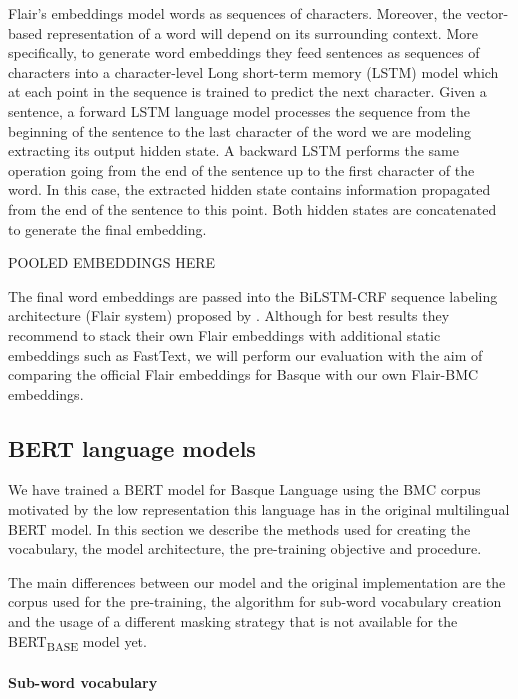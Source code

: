 \documentclass[10pt, a4paper]{article}
\begin{document}
Flair's embeddings model words as sequences of characters. Moreover, the vector-based representation of a word will depend on its surrounding context. More specifically, to generate word embeddings they feed sentences as sequences of characters into a character-level Long short-term memory (LSTM) model which at each point in the sequence is trained to predict the next character. Given a sentence, a forward LSTM language model processes the sequence from the beginning of the sentence to the last character of the word we are modeling extracting its output hidden state. A backward LSTM performs the same operation going from the end of the sentence up to the first character of the word. In this case, the extracted hidden state contains information propagated from the end of the sentence to this point. Both hidden states are concatenated to generate the final embedding.

POOLED EMBEDDINGS HERE

The final word embeddings are passed into the BiLSTM-CRF sequence labeling architecture (Flair system) proposed by \cite{huang2015bidirectional}. Although for best results they recommend to stack their own Flair embeddings with additional static embeddings such as FastText, we will perform our evaluation with the aim of comparing the official Flair embeddings for Basque with our own Flair-BMC embeddings.

\subsection{BERT language models}\label{sec:build-basq-models:bert}

We have trained a BERT \cite{devlin2019bert} model for Basque Language using the BMC corpus motivated by the low representation this language has in the original multilingual BERT model. In this section we describe the methods used for creating the vocabulary, the model architecture, the pre-training objective and procedure.

The main differences between our model and the original implementation are the corpus used for the pre-training, the algorithm for sub-word vocabulary creation and the usage of a different masking strategy that is not available for the BERT\textsubscript{BASE} model yet. 

\paragraph{Sub-word vocabulary}
\end{document}
